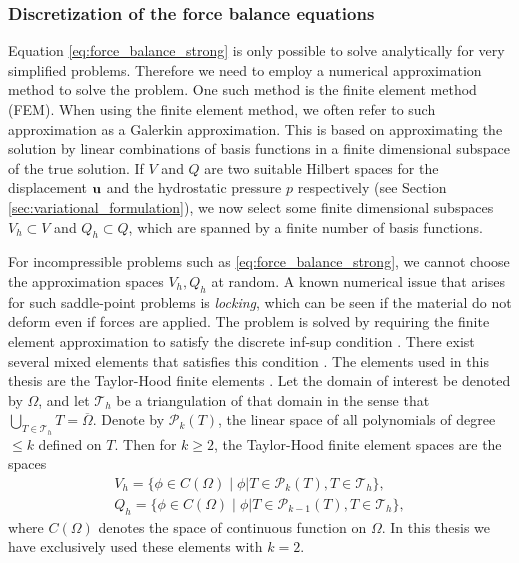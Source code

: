 \subsubsection{Discretization of the force balance equations}

Equation \eqref{eq:force_balance_strong} is only possible to solve
analytically for very simplified problems. Therefore we need to employ
a numerical approximation method to solve the problem. One such method
is the finite element method (FEM). When using the finite element method, we often refer to such
approximation as a Galerkin approximation. This is based on
approximating the solution by linear combinations of  basis functions in a finite dimensional
subspace of the true solution. If $V$ and $Q$ are two suitable Hilbert
spaces for the displacement $\mathbf{u}$ and the hydrostatic pressure $p$
respectively (see Section \ref{sec:variational_formulation}), we now
select some finite dimensional subspaces $V_h \subset V$ and $Q_h
\subset Q$, which are spanned by a finite number of basis functions.


For incompressible problems such as \eqref{eq:force_balance_strong}, we cannot choose the
approximation spaces $V_h, Q_h$ at random. A known numerical issue
that arises for such saddle-point problems is \emph{locking}, which can be
seen if the material do not deform even if forces are applied. The
problem is solved by requiring the finite element approximation to
satisfy the discrete inf-sup condition \cite{le1982existence}. There
exist several mixed elements that satisfies this condition
\cite{chapelle1993inf}. The elements used in this thesis are the
Taylor-Hood finite elements \cite{taylor1973numerical}. Let the domain of
interest be denoted by $\Omega$, and let $\mathcal{T}_h$ be a
triangulation of that domain in the sense that $\bigcup_{T \in
  \mathcal{T}_h} T = \overline{\Omega}$. Denote by $\mathcal{P}_k
(T)$, the linear space of all polynomials of degree $\leq k$ defined
on $T$. Then for $k \geq 2$, the Taylor-Hood finite element spaces are the spaces
\begin{align}
  V_h = \{  \phi \in C(\Omega) \;  | \; \phi \big| T  \in \mathcal{P}_k (T) , T \in \mathcal{T}_h \},\\
  Q_h = \{  \phi \in C(\Omega) \;  | \; \phi \big| T  \in \mathcal{P}_{k-1} (T) , T \in \mathcal{T}_h \},
\end{align}
where $C(\Omega)$ denotes the space of continuous function on
$\Omega$. In this thesis we have exclusively used these elements with
$k = 2$.



